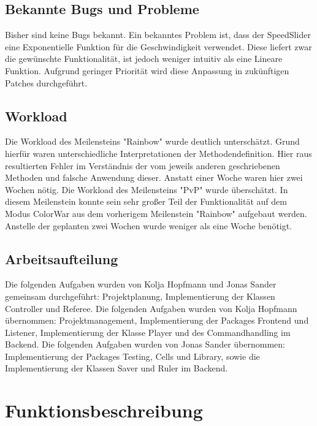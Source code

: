 \documentclass[12pt]{article}
\theoremstyle{plain}
\begin{document}
\subsection{Bekannte Bugs und Probleme}
Bisher sind keine Bugs bekannt. Ein bekanntes Problem ist, dass der SpeedSlider eine Exponentielle Funktion für die Geschwindigkeit verwendet. Diese liefert zwar die gewünschte Funktionalität, ist jedoch weniger intuitiv als eine Lineare Funktion. Aufgrund geringer Priorität wird diese Anpassung in zukünftigen Patches durchgeführt.
\subsection{Workload}
Die Workload des Meilensteins "Rainbow" wurde deutlich unterschätzt. Grund hierfür waren unterschiedliche Interpretationen der Methodendefinition. Hier raus resultierten Fehler im Verständnis der vom jeweils anderen geschriebenen Methoden und falsche Anwendung dieser. Anstatt einer Woche waren hier zwei Wochen nötig. Die Workload des Meilensteins "PvP" wurde überschätzt. In diesem Meilenstein konnte sein sehr großer Teil der Funktionalität auf dem Modus ColorWar aus dem vorherigem Meilenstein "Rainbow" aufgebaut werden. Anstelle der geplanten zwei Wochen wurde weniger als eine Woche benötigt.
\subsection{Arbeitsaufteilung}
Die folgenden Aufgaben wurden von Kolja Hopfmann und Jonas Sander gemeinsam durchgeführt: Projektplanung, Implementierung der Klassen Controller und Referee.
Die folgenden Aufgaben wurden von Kolja Hopfmann übernommen: Projektmanagement, Implementierung der Packages Frontend und Listener, Implementierung der Klasse Player und des Commandhandling im Backend.
Die folgenden Aufgaben wurden von Jonas Sander übernommen: Implementierung der Packages Testing, Cells und Library, sowie die Implementierung der Klassen Saver und Ruler im Backend.
\section{Funktionsbeschreibung}
\end{document}
